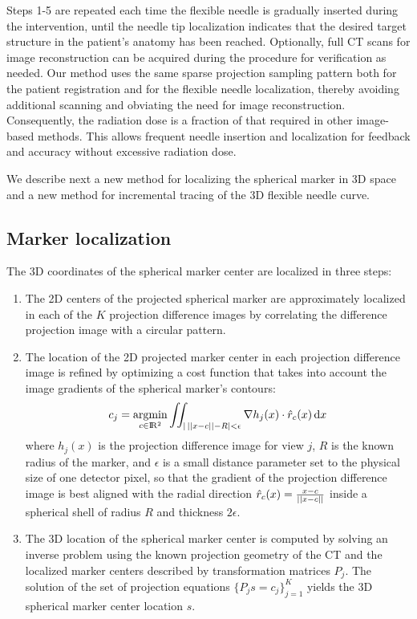 Steps 1-5 are repeated each time the flexible needle is gradually inserted during the intervention, until the needle tip localization indicates that the desired target structure in the patient's anatomy has been reached. Optionally, full CT scans for image reconstruction can be acquired during the procedure for verification as needed. Our method uses the same sparse projection sampling pattern both for the patient registration and for the flexible needle localization, thereby avoiding additional scanning and obviating the need for image reconstruction. Consequently, the radiation dose is a fraction of that required in other image-based methods. This allows frequent needle insertion and localization for feedback and accuracy without excessive radiation dose.

We describe next a new method for localizing the spherical marker in 3D space and a new method for incremental tracing of the 3D flexible needle curve.

\subsection*{\textbf{Marker localization}} \label{markerloc}
The 3D coordinates of the spherical marker center are localized in three steps:
\begin{enumerate}
    \item 
    {
    The 2D centers of the projected spherical marker are approximately localized in each of the $K$ projection difference images by correlating the difference projection image with a circular pattern. \\[0.5ex]
    }
    \item 
    {
    The location of the 2D projected marker center in each projection difference image is refined by optimizing a cost function that takes into account the image gradients of the spherical marker's contours:
    \begin{equation}
        c_j = \operatorname*{argmin}_{c \in \rm I\!R^2}{
        \iint_{\lvert \, \lvert\lvert x-c \rvert\rvert - R \rvert < \epsilon}
        {\nabla h_j(x) \cdot \hat{r}_c (x)} \, \mathrm{d}x}
    \end{equation}
    where $h_j(x)$ is the projection difference image for view $j$, $R$ is the known radius of the marker, and $\epsilon$ is a small distance parameter set to the physical size of one detector pixel, so that the gradient of the projection difference image is best aligned with the radial direction $\hat{r}_c (x) = \frac{x-c}{ \\\lvert\lvert x-c \rvert\rvert}$ inside a spherical shell of radius $R$ and thickness $2\epsilon$. \\[0.5ex]
    }
    \item
    {
    The 3D location of the spherical marker center is computed by solving an inverse problem using the known projection geometry of the CT and the localized marker centers described by transformation matrices $P_j$. The solution of the set of projection equations $\{P_j s = c_j\}_{j=1}^K$  yields the 3D spherical marker center location $s$.
    }
\end{enumerate}

